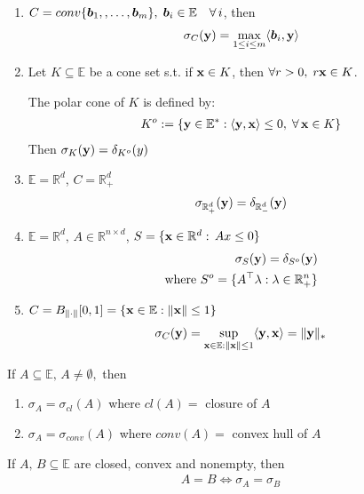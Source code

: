 \documentclass[11pt]{article}
\begin{document}
\begin{example}
    \begin{enumerate}
        \item $C = conv\{ {\bm{b}}_1,, \ldots ,{\bm{b}}_m \}, \; {\bm{b}}_i \in \mathbb{E} \quad \forall\, i$, then
        \begin{align*}
            \sigma_{C}({\mathbf{y}}) = \max_{1 \le i \le m} \langle {\bm{b}}_i,{\mathbf{y}} \rangle
        \end{align*}
        \item Let $K \subseteq \mathbb{E}$ be a cone set s.t. if ${\mathbf{x}} \in K$, then $\forall r > 0,
        \; r{\mathbf{x}} \in K$.

        The polar cone of $K$ is defined by:
        \begin{align*}
            K^{o} := \{ {\mathbf{y}} \in \mathbb{E}^{*}: \langle {\mathbf{y}},{\mathbf{x}} \rangle \le 0, \; \forall \,{\mathbf{x}} \in K \}
        \end{align*}
        Then $\sigma_{K}({\mathbf{y}}) = \delta_{K^{o}}(y)$

        \item $\mathbb{E} = \mathbb{R}^{d}$, $C = \mathbb{R}_{+}^{d}$
        \begin{align*}
            \sigma_{\mathbb{R}_{+}^{d}}({\mathbf{y}}) = \delta_{\mathbb{R}_{-}^{d}}({\mathbf{y}})
        \end{align*}

        \item $\mathbb{E} = \mathbb{R}^{d}, \,A \in \mathbb{R}^{n\times d}$, $
        S = \{ {\mathbf{x}} \in \mathbb{R}^{d}: \, Ax \le 0 \}$
        \begin{align*}
            \sigma_{S}({\mathbf{y}}) = \delta_{S^{o}}({\mathbf{y}}) \\
            \text{where } S^{o} = \{ A^{\top}\lambda: \lambda \in \mathbb{R}_{+}^{n} \}
        \end{align*}
        \item $C = B_{\| \cdot  \| }[0,1] = \{ {\mathbf{x}} \in \mathbb{E}: \| {\mathbf{x}} \| \le 1 \}$
        \begin{align*}
            \sigma_{C}({\mathbf{y}}) = \sup_{{\mathbf{x}} \in \mathbb{E}: \| {\mathbf{x}} \| \le 1}\langle {\mathbf{y}},{\mathbf{x}} \rangle 
            = \| {\mathbf{y}} \|_{*}
        \end{align*}
    \end{enumerate}
\end{example}

\begin{proposition}
    If $A \subseteq  \mathbb{E}, \, A \neq \emptyset,$ then
    \begin{enumerate}
        \item $\sigma_{A} = \sigma_{cl}(A)$ where $cl(A) = $ closure of $A$
        \item $\sigma_{A} = \sigma_{conv}(A)$ where $conv(A) = $ convex hull of $A$
    \end{enumerate}
    If $A,\, B \subseteq \mathbb{E}$ are closed, convex and nonempty, then 
    \begin{align*}
        A = B \iff \sigma_{A} = \sigma_{B}
    \end{align*}
\end{proposition}
\end{document}
